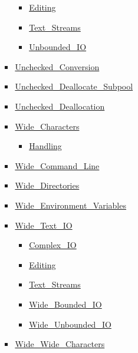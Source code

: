 \begin{scriptsize}
\begin{multicols*}{\columnnr}
\begin{itemize}[leftmargin=0mm]
\begin{itemize}[leftmargin=5mm]
\begin{itemize}[leftmargin=5mm]
\begin{itemize}[leftmargin=5mm]
	  \item[] \href{http://www.ada-auth.org/standards/22rm/html/RM-F-3-3.html}{Editing}
	  \item[] \href{http://www.ada-auth.org/standards/22rm/html/RM-A-12-2.html}{Text\_Streams}
	  \item[] \href{http://www.ada-auth.org/standards/22rm/html/RM-A-10-12.html}{Unbounded\_IO}
	  \end{itemize}
	\item[] \href{http://www.ada-auth.org/standards/22rm/html/RM-13-9.html}{Unchecked\_Conversion}
	\item[] \href{http://www.ada-auth.org/standards/22rm/html/RM-13-11-5.html}{Unchecked\_Deallocate\_Subpool}
	\item[] \href{http://www.ada-auth.org/standards/22rm/html/RM-13-11-2.html}{Unchecked\_Deallocation}
	\item[] \href{http://www.ada-auth.org/standards/22rm/html/RM-A-3-1.html}{Wide\_Characters}
	  \begin{itemize}[leftmargin=5mm]
	  \item[] \href{http://www.ada-auth.org/standards/22rm/html/RM-A-3-5.html}{Handling}
	  \end{itemize}
	\item[] \href{http://www.ada-auth.org/standards/22rm/html/RM-A-15-1.html}{Wide\_Command\_Line}
	\item[] \href{http://www.ada-auth.org/standards/22rm/html/RM-A-16-2.html}{Wide\_Directories}
	\item[] \href{http://www.ada-auth.org/standards/22rm/html/RM-A-17-1.html}{Wide\_Environment\_Variables}
	\item[] \href{http://www.ada-auth.org/standards/22rm/html/RM-A-11.html}{Wide\_Text\_IO}
	  \begin{itemize}[leftmargin=5mm]
	  \item[] \href{http://www.ada-auth.org/standards/22rm/html/RM-G-1-4.html}{Complex\_IO}
	  \item[] \href{http://www.ada-auth.org/standards/22rm/html/RM-F-3-4.html}{Editing}
	  \item[] \href{http://www.ada-auth.org/standards/22rm/html/RM-A-12-3.html}{Text\_Streams}
	  \item[] \href{http://www.ada-auth.org/standards/22rm/html/RM-A-11.html}{Wide\_Bounded\_IO}
	  \item[] \href{http://www.ada-auth.org/standards/22rm/html/RM-A-11.html}{Wide\_Unbounded\_IO}
	  \end{itemize}
	\item[] \href{http://www.ada-auth.org/standards/22rm/html/RM-A-3-1.html}{Wide\_Wide\_Characters}

\end{itemize}
\end{itemize}
\end{itemize}
\end{multicols*}
\end{scriptsize}
